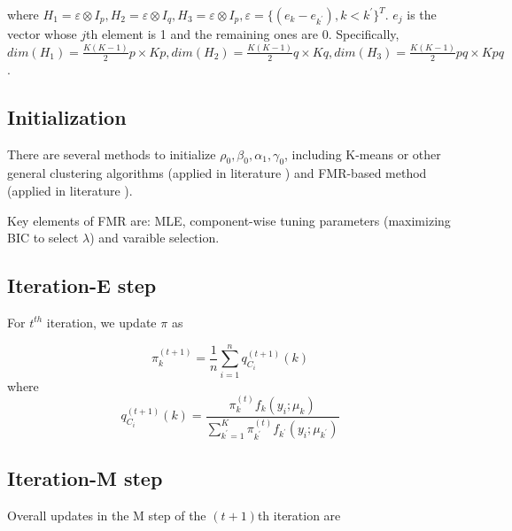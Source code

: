 \documentclass[12pt, a4paper, oneside]{article}
\numberwithin{equation}{section}
\begin{document}
where $H_1 = \varepsilon \otimes I_p, H_2 = \varepsilon \otimes I_q, H_3 = \varepsilon \otimes I_p, \varepsilon = \{(e_k - e_{k^\prime}), k < {k^\prime}\}^T$. $e_j$ is the vector whose $j$th element is 1 and the remaining ones are 0. Specifically, $dim(H_1) = \frac{K(K-1)}{2}p\times Kp, dim(H_2) = \frac{K(K-1)}{2}q\times Kq, dim(H_3) = \frac{K(K-1)}{2}pq\times Kpq$. 

\subsection{Initialization}
\label{subsec:initialization}

There are several methods to initialize $\rho_0, \beta_0, \alpha_1, \gamma_0$, including K-means or other general clustering algorithms (applied in literature \cite{ggm}) and FMR-based method (applied in literature \cite{main}). 

Key elements of FMR are: MLE, component-wise tuning parameters (maximizing BIC to select $\lambda$) and varaible selection.

\subsection{Iteration-E step}
\label{subsec:iteration-e-step}

For $t^{th}$ iteration, we update $\pi$ as 

\begin{equation}
\label{eq:step-e1}
\pi_k^{(t+1)} = \frac{1}{n}\displaystyle\sum_{i=1}^{n}q_{C_i}^{(t+1)}(k)
\end{equation}
where
\begin{equation}
\label{eq:step-e2}
q_{C_i}^{(t+1)}(k) = \frac{\pi_k^{(t)}f_k(y_i;\mu_k)}{\displaystyle\sum_{k^\prime=1}^{K}\pi_{k^\prime}^{(t)}f_{k^\prime}(y_i;\mu_{k^\prime})}
\end{equation}

\subsection{Iteration-M step}

Overall updates in the M step of the $(t+1)$th iteration are
\end{document}
